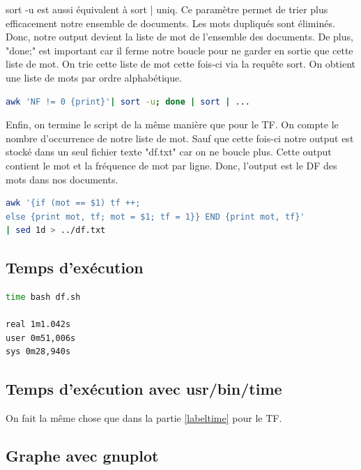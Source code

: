 \documentclass{article}
\begin{document}
sort -u est aussi équivalent à sort | uniq.
Ce paramètre permet de trier plus efficacement notre ensemble de documents. Les mots dupliqués sont éliminés. Donc, notre output devient la liste de mot de l'ensemble des documents. De plus, "done;" est important car il ferme notre boucle pour ne garder en sortie que cette liste de mot.
On trie cette liste de mot cette fois-ci via la requête sort. On obtient une liste de mots par ordre alphabétique.

\begin{lstlisting}[language=bash,caption={Tris}]
awk 'NF != 0 {print}'| sort -u; done | sort | ...
\end{lstlisting}

Enfin, on termine le script de la même manière que pour le TF. On compte le nombre d'occurrence de notre liste de mot. Sauf que cette fois-ci notre output est stocké dans un seul fichier texte "df.txt" car on ne boucle plus. Cette output contient le mot et la fréquence de mot par ligne. Donc, l'output est le DF des mots dans nos documents.

\begin{lstlisting}[language=bash,caption={Occurences}]
awk '{if (mot == $1) tf ++; 
else {print mot, tf; mot = $1; tf = 1}} END {print mot, tf}' 
| sed 1d > ../df.txt
\end{lstlisting}

\subsection{Temps d'exécution}

\begin{lstlisting}[language=bash,caption={Temps d'exécution du script df.sh}]
time bash df.sh

real 1m1.042s
user 0m51,006s
sys 0m28,940s

\end{lstlisting}

\subsection{Temps d'exécution avec usr/bin/time}

On fait la même chose que dans la partie \ref{labeltime} pour le TF.

\subsection{Graphe avec gnuplot}
\end{document}
